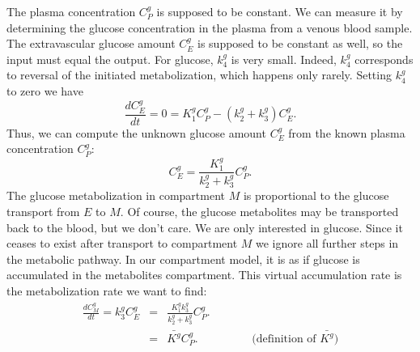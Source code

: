 The plasma concentration $C_P^g$ is supposed to be constant. We can
measure it by determining the glucose concentration in the plasma from
a venous blood sample. The extravascular glucose amount $C_E^g$ is
supposed to be constant as well, so the input must equal the
output. For glucose, $k_4^g$ is very small. Indeed, $k_4^g$
corresponds to reversal of the initiated metabolization, which happens
only rarely. Setting $k_4^g$ to zero we have
\begin{equation}
\frac{d C_E^g}{dt} = 0 = K_1^g C_P^g - (k_2^g + k_3^g) C_E^g.
\end{equation}
Thus, we can compute the unknown glucose amount $C_E^g$ from the known plasma
concentration $C_P^g$:
\begin{equation}
  C_E^g = \frac{K_1^g}{k_2^g + k_3^g} C_P^g.
\end{equation}
The glucose metabolization in compartment $M$ is proportional to the glucose
transport from $E$ to $M$. Of course, the glucose metabolites may be
transported back to the blood, but we don't care. We are only interested in
glucose. Since it ceases to exist after transport to compartment $M$ we ignore
all further steps in the metabolic pathway. In our compartment model, it is as
if glucose is accumulated in the metabolites compartment. This virtual
accumulation rate is the metabolization rate we want to find:
\begin{eqnarray}
  \frac{d C_M^g}{d t} = k_3^g C_E^g & = & 
   \frac{K_1^g k_3^g}{k_2^g + k_3^g} C_P^g.\\
  & = & \bar{K^g}  C_P^g. \hspace{2cm} \mbox{$($definition of } \bar{K^g})
\end{eqnarray}

